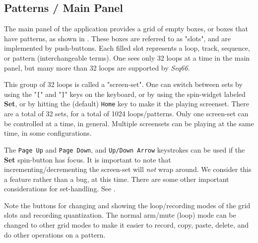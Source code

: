 
\subsection{Patterns / Main Panel}
\label{subsec:patterns_panel_main}

   The main panel of the application provides a grid of empty boxes,
   or boxes that have patterns,
   as shown in
   .
   These boxes are referred to as "slots", and are implemented by
   push-buttons.
   Each filled slot represents a loop, track, sequence, or pattern
   (interchangeable terms).
   One sees only 32 loops at a time in the main panel, but many more than
   32 loops are supported by \textsl{Seq66}.

   This group of 32 loops is called a "screen-set".
   One can switch between sets by using the
   \index{keys![}
   "\texttt{[}" and
   \index{keys!]}
   "\texttt{]}" keys on the keyboard, or by using
   the spin-widget labeled \textbf{Set}, or
   by hitting the (default) \texttt{Home} key to make it the playing screenset.
   There are a total of 32 sets, for a total of 1024 loops/patterns. 
   Only one screen-set can be controlled at a time, in general.
   Multiple screensets can be playing at the same time, in some configurations.

   The \texttt{Page Up} and \texttt{Page Down}, and \texttt{Up/Down Arrow}
   keystrokes can be used if the \textbf{Set} spin-button has focus.
   It is important to note that incrementing/decrementing
   the screen-set will \textsl{not} wrap around.
   We consider this a feature rather than a bug, at this time.
   There are some other important considerations for set-handling.
   See .

   Note the buttons for changing and showing the
   loop/recording modes of the grid slots and recording quantization.
   The normal arm/mute (loop) mode can be changed to other grid
   modes to make it easier to record, copy, paste, delete, and do other
   operations on a pattern.

